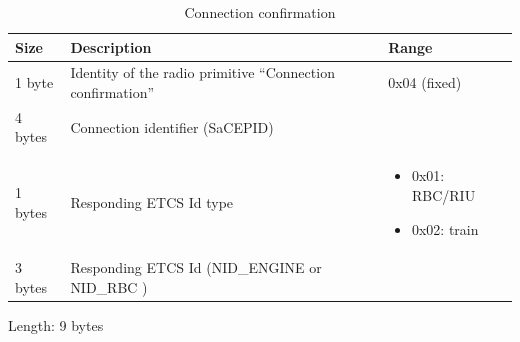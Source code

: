 \documentclass[nocc]{template/openetcs_report}
\begin{document}
 			\begin{longtable}{|l|l|l|}
				\caption{Connection confirmation}\\ 
				\hline
				
					\begin{minipage}[t]{0.1\linewidth} \textbf{Size}	\end{minipage}
				&	\begin{minipage}[t]{0.5\linewidth} \textbf{Description}	\end{minipage}
				&	\begin{minipage}[t]{0.3\linewidth} \textbf{Range} \end{minipage} \\
				
				\hline
					 \begin{minipage}[t]{0.1\linewidth}1 byte \end{minipage}
					&\begin{minipage}[t]{0.6\linewidth}Identity of the radio primitive "`Connection confirmation"'	\end{minipage}
					&\begin{minipage}[t]{0.3\linewidth}0x04 (fixed) \end{minipage} \\
					
				\hline
					 \begin{minipage}[t]{0.1\linewidth}4 bytes \end{minipage}
					&\begin{minipage}[t]{0.6\linewidth}Connection identifier (SaCEPID)	\end{minipage}
					&\begin{minipage}[t]{0.3\linewidth} \end{minipage} \\
					
				\hline
					 \begin{minipage}[t]{0.1\linewidth}1 bytes \end{minipage}
					&\begin{minipage}[t]{0.6\linewidth}Responding ETCS Id type	\end{minipage}
					&\begin{minipage}[t]{0.3\linewidth}
							\begin{itemize}
								\item 0x01: RBC/RIU
								\item 0x02: train
							\end{itemize}						
					  \end{minipage} \\
					
				\hline
					 \begin{minipage}[t]{0.1\linewidth}3 bytes \end{minipage}
					&\begin{minipage}[t]{0.6\linewidth}Responding ETCS Id (NID\_ENGINE or NID\_RBC )\end{minipage}
					&\begin{minipage}[t]{0.3\linewidth}\end{minipage} \\
				\hline
			\end{longtable}
			Length: 9 bytes
\end{document}
